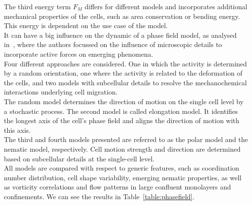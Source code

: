 The third energy term $F_M$ differs for different models and incorporates additional mechanical properties of the cells, such as area conservation or bending energy.
This energy is dependent on the use case of the model. \\
It can have a big influence on the dynamic of a phase field model, as analysed in~\cite{wenzel2021}, where the authors focussed on the influence of microscopic details to incorporate active forces on emerging phenomena.\\
Four different approaches are considered.
One in which the activity is determined by a random orientation, one where the activity is related to the deformation of the cells, and two models with subcellular details to resolve the mechanochemical interactions underlying cell migration. \\
The random model determines the direction of motion on the single cell level by a stochastic process. 
The second model is called elongation model.
It identifies the longest axis of the cell's phase field and aligns the direction of motion with this axis. \\
The third and fourth models presented are referred to as the polar model and the nematic model, respectively.
Cell motion strength and direction are determined based on subcellular details at the single-cell level. \\
All models are compared with respect to generic features, such as coordination number distribution, cell shape variability, emerging nematic properties, as well as vorticity correlations and flow patterns in large confluent monolayers and confinements. 
We can see the results in Table~\ref{table:phasefield}. \\


